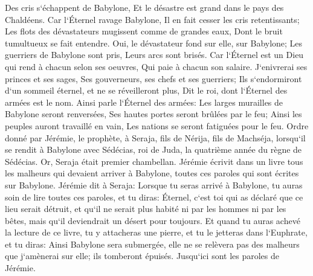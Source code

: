 \verse Des cris s`échappent de Babylone, Et le désastre est grand dans le pays des Chaldéens. 
\verse Car l`Éternel ravage Babylone, Il en fait cesser les cris retentissants; Les flots des dévastateurs mugissent comme de grandes eaux, Dont le bruit tumultueux se fait entendre. 
\verse Oui, le dévastateur fond sur elle, sur Babylone; Les guerriers de Babylone sont pris, Leurs arcs sont brisés. Car l`Éternel est un Dieu qui rend à chacun selon ses oeuvres, Qui paie à chacun son salaire. 
\verse J`enivrerai ses princes et ses sages, Ses gouverneurs, ses chefs et ses guerriers; Ils s`endormiront d`un sommeil éternel, et ne se réveilleront plus, Dit le roi, dont l`Éternel des armées est le nom. 
\verse Ainsi parle l`Éternel des armées: Les larges murailles de Babylone seront renversées, Ses hautes portes seront brûlées par le feu; Ainsi les peuples auront travaillé en vain, Les nations se seront fatiguées pour le feu. 
\verse Ordre donné par Jérémie, le prophète, à Seraja, fils de Nérija, fils de Machséja, lorsqu`il se rendit à Babylone avec Sédécias, roi de Juda, la quatrième année du règne de Sédécias. Or, Seraja était premier chambellan. 
\verse Jérémie écrivit dans un livre tous les malheurs qui devaient arriver à Babylone, toutes ces paroles qui sont écrites sur Babylone. 
\verse Jérémie dit à Seraja: Lorsque tu seras arrivé à Babylone, tu auras soin de lire toutes ces paroles, 
\verse et tu diras: Éternel, c`est toi qui as déclaré que ce lieu serait détruit, et qu`il ne serait plus habité ni par les hommes ni par les bêtes, mais qu`il deviendrait un désert pour toujours. 
\verse Et quand tu auras achevé la lecture de ce livre, tu y attacheras une pierre, et tu le jetteras dans l`Euphrate, 
\verse et tu diras: Ainsi Babylone sera submergée, elle ne se relèvera pas des malheurs que j`amènerai sur elle; ils tomberont épuisés. Jusqu`ici sont les paroles de Jérémie. 

